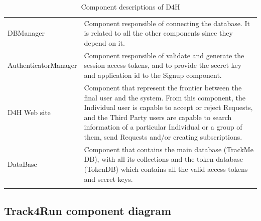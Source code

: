 \documentclass[a4paper, hidelinks, 12pt]{report}
\begin{document}
\begin{longtable}{l p{}}
			DBManager & Component responsible of connecting the database. It is related to all the other components since they depend on it.\\
			
			AuthenticatorManager & Component responsible of validate and generate the session access tokens, and to provide the secret key and application id to the Signup component.\\
			
			D4H Web site & Component that represent the frontier between the final user and the system. From this component, the Individual user is capable to accept or reject Requests, and the Third Party users are capable to search information of a particular Individual or a group of them, send Requests and/or creating subscriptions.\\
			
			DataBase & Component that contains the main database (TrackMe DB), with all its collections and the token database (TokenDB) which contains all the valid access tokens and secret keys.\\
			
			\hline
			\caption{Component descriptions of D4H}
			\label{table:d4h_component_descriptions}
		\end{longtable}
			
		\subsection{Track4Run component diagram}
\end{document}
